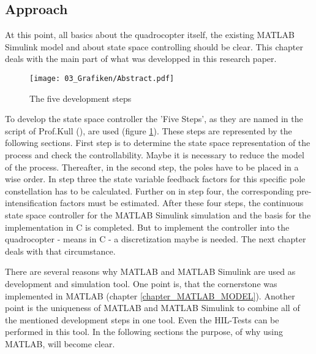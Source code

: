 \subsection{Approach}\label{chapter_Approach}

At this point, all basics about the quadrocopter itself, the existing MATLAB Simulink model and about state space controlling should be clear. This chapter deals with the main part of what was developped in this research paper. 

\begin{figure}
	\centering
		\texttt{[image: 03\_Grafiken/Abstract.pdf]}
	\caption{The five development steps}
	\label{fig:Abstract}
\end{figure}

To develop the state space controller the 'Five Steps', as they are named in the script of Prof.Kull (\cite{bib:KULL}), are used (figure \ref{fig:Abstract}). These steps are represented by the following sections. First step is to determine the state space representation of the process and check the controllability. Maybe it is necessary to reduce the model of the process. Thereafter, in the second step, the poles have to be placed in a wise order. In step three the state variable feedback factors for this specific pole constellation has to be calculated. Further on in step four, the corresponding pre-intensification factors must be estimated. After these four steps, the continuous state space controller for the MATLAB Simulink simulation and the basis for the implementation in C is completed. But to implement the controller into the quadrocopter - means in C - a discretization maybe is needed. The next chapter deals with that circumstance.

There are several reasons why MATLAB and MATLAB Simulink are used as development and simulation tool. One point is, that the cornerstone was implemented in MATLAB (chapter \ref{chapter_MATLAB_MODEL}). Another point is the uniqueness of MATLAB and MATLAB Simulink to combine all of the mentioned development steps in one tool. Even the HIL-Tests can be performed in this tool.
In the following sections the purpose, of why using MATLAB, will become clear.